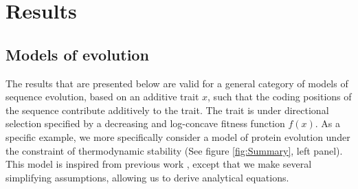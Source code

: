 \section{Results}

\subsection{Models of evolution}

The results that are presented below are valid for a general category of models of sequence evolution, based on an additive trait $x$, such that the coding positions of the sequence contribute additively to the trait.
The trait is under directional selection specified by a decreasing and log-concave fitness function $f(x)$. As a specific example, we more specifically consider a model of protein evolution under the constraint of thermodynamic stability (See figure \ref{fig:Summary}, left panel). This model is inspired from previous work \citep{Williams2006, Goldstein2011, Pollock2012}, except that we make several simplifying assumptions, allowing us to derive analytical equations. 

